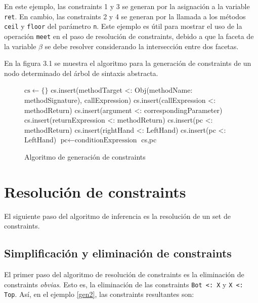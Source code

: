 En este ejemplo, las constraints 1 y 3 se generan por la asignación a la variable \texttt{ret}. En cambio, las constraints 2 y 4 se generan por la llamada a los métodos \texttt{ceil} y \texttt{floor} del parámetro \texttt{n}. Este ejemplo es útil para mostrar el uso de la operación \texttt{meet} en el paso de resolución de constraints, debido a que la faceta de la variable $\beta$ se debe resolver considerando la intersección entre dos facetas.

En la figura 3.1 se muestra el algoritmo para la generación de constraints de un nodo determinado del árbol de sintaxis abstracta.

\begin{figure}[ht]
  \centering
  \label{pseudogen}
  \begin{mdframed}
    \begin{algorithmic}
          \State $\text{cs}\gets \{\}$
            \State cs.insert(methodTarget <: Obj(methodName: methodSignature), callExpression)
            \State cs.insert(callExpression <: methodReturn)
              \State cs.insert(argument <: correspondingParameter)
            \EndFor
            \State cs.insert(returnExpression <: methodReturn)
            \State cs.insert(pc <: methodReturn)
            \State cs.insert(rightHand <: LeftHand)
            \State cs.insert(pc <: LeftHand)
            \State $\text{pc}\gets \text{conditionExpression}$
          \EndIf
          \State \Return cs,pc
      \EndFunction
    \end{algorithmic}
  \end{mdframed}
  \caption{Algoritmo de generación de constraints}
\end{figure}


\section{Resolución de constraints}

El siguiente paso del algoritmo de inferencia es la resolución de un set de constraints.

\subsection{Simplificación y eliminación de constraints}
El primer paso del algoritmo de resolución de constraints es la eliminación de constraints \textit{obvias}. Esto es, la eliminación de las constraints \texttt{Bot <: X} y \texttt{X <: Top}. Así, en el ejemplo \ref{gen2}, las constraints resultantes son:

